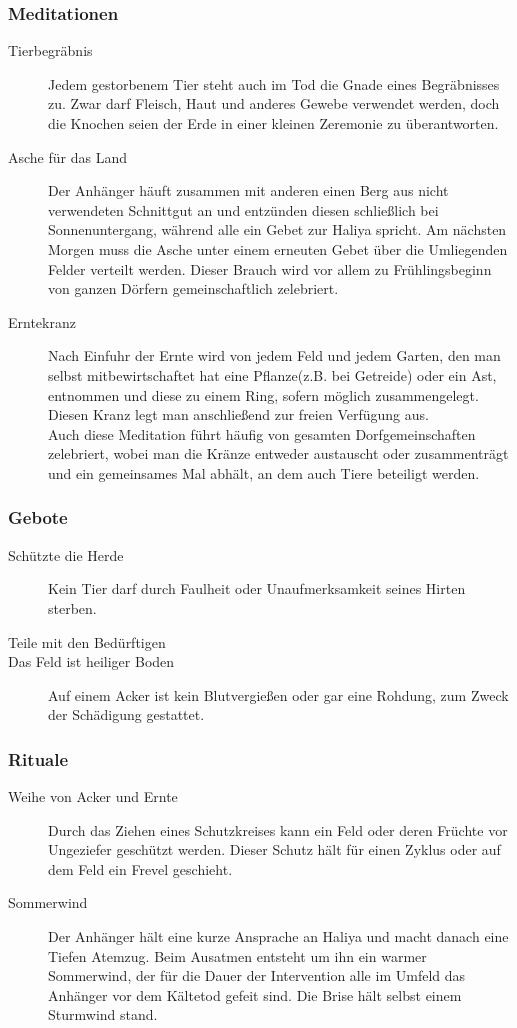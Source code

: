 \documentclass[a4paper,12pt,oneside]{book}
\begin{document}
\subsubsection{Meditationen}
\begin{description}
\item[Tierbegräbnis]
Jedem gestorbenem Tier steht auch im Tod die Gnade eines Begräbnisses zu. Zwar darf Fleisch, Haut und anderes Gewebe verwendet werden, doch die Knochen seien der Erde in einer kleinen Zeremonie zu überantworten.
\item[Asche für das Land]
Der Anhänger häuft zusammen mit anderen einen Berg aus nicht verwendeten Schnittgut an und entzünden diesen schließlich bei Sonnenuntergang, während alle ein Gebet zur Haliya spricht. Am nächsten Morgen muss die Asche unter einem erneuten Gebet über die Umliegenden Felder verteilt werden. Dieser Brauch wird vor allem zu Frühlingsbeginn von ganzen Dörfern gemeinschaftlich zelebriert.
\item[Erntekranz] 
Nach Einfuhr der Ernte wird von jedem Feld und jedem Garten, den man selbst mitbewirtschaftet hat eine Pflanze(z.B. bei Getreide) oder ein Ast, entnommen und diese zu einem Ring, sofern möglich zusammengelegt. Diesen Kranz legt man anschließend zur freien Verfügung aus.
\\Auch diese Meditation führt häufig von gesamten Dorfgemeinschaften zelebriert, wobei man die Kränze entweder austauscht oder zusammenträgt und ein gemeinsames Mal abhält, an dem auch Tiere beteiligt werden.
\end{description}
\subsubsection{Gebote}
\begin{description}
\item[Schützte die Herde]
Kein Tier darf durch Faulheit oder Unaufmerksamkeit seines Hirten sterben.
\item[Teile mit den Bedürftigen]
\item[Das Feld ist heiliger Boden]
Auf einem Acker ist kein Blutvergießen oder gar eine Rohdung, zum Zweck der Schädigung gestattet.
\end{description}
\subsubsection{Rituale}
\begin{description}
\item[Weihe von Acker und Ernte]
Durch das Ziehen eines Schutzkreises kann ein Feld oder deren Früchte vor Ungeziefer geschützt werden. Dieser Schutz hält für einen Zyklus oder auf dem Feld ein Frevel geschieht.
\item[Sommerwind]
Der Anhänger hält eine kurze Ansprache an Haliya und macht danach eine Tiefen Atemzug. Beim Ausatmen entsteht um ihn ein warmer Sommerwind, der für die Dauer der Intervention alle im Umfeld das Anhänger vor dem Kältetod gefeit sind. Die Brise hält selbst einem Sturmwind stand.
\end{description}
\end{document}
